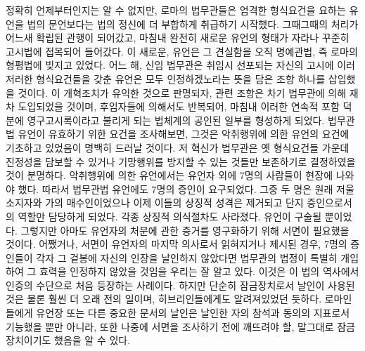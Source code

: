정확히 언제부터인지는 알 수 없지만,
로마의 법무관들은
엄격한 형식요건을 요하는 유언을
법의 문언보다는 법의 정신에 더 부합하게
취급하기 시작했다.
그때그때의 처리가 어느새 확립된 관행이 되어갔고,
마침내 완전히 새로운 유언의 형태가 자라나
꾸준히 고시법에 접목되어 들어갔다.
이 새로운,  유언은 그 견실함을
오직 명예관법, 즉 로마의 형평법에
빚지고 있었다.
어느 해, 신임 법무관은 취임시 선포되는 자신의 고시에
이러저러한 형식요건들을 갖춘 유언은 모두 인정하겠노라는 뜻을 담은
조항 하나를 삽입했을 것이다.
이 개혁조치가 유익한 것으로 판명되자, 관련 조항은
차기 법무관에 의해 재차 도입되었을 것이며,
후임자들에 의해서도 반복되어, 마침내
이러한 연속적 포함 덕분에 영구고시록이라고 불리게 되는
법체계의 공인된 일부를 형성하게 되었다.
법무관법 유언이 유효하기 위한 요건을 조사해보면,
그것은 악취행위에 의한 유언의 요건에 기초하고 있었음이 명백히 드러날 것이다.
저 혁신가 법무관은 옛 형식요건들 가운데 진정성을 담보할 수 있거나
기망행위를 방지할 수 있는 것들만 보존하기로 결정하였을 것이 분명하다.
악취행위에 의한 유언에서는 유언자 외에 7명의 사람들이 현장에 나와야 했다.
따라서 법무관법 유언에도 7명의 증인이 요구되었다.
그중 두 명은 원래 저울소지자와
가의 매수인이었으나 이제 이들의 상징적 성격은
제거되고 단지 증인으로서의 역할만 담당하게 되었다.
각종 상징적 의식절차도 사라졌다.
유언이 구술될 뿐이었다. 그렇지만 아마도
유언자의 처분에 관한 증거를 영구화하기 위해 서면이 필요했을 것이다.
어쨌거나, 서면이 유언자의 마지막 의사로서 읽혀지거나 제시된 경우,
7명의 증인들이 각자 그 겉봉에 자신의 인장을 날인하지 않았다면
법무관의 법정이
특별히 개입하여
그 효력을 인정하지 않았을 것임을 우리는 잘 알고 있다.
이것은
이
법의 역사에서
인증의 수단으로
처음 등장하는 사례이다.
하지만
단순히 잠금장치로서 날인이 사용된 것은 물론 훨씬 더 오래 전의 일이며,
히브리인들에게도 알려져있었던 듯하다.
로마인들에게 유언장 또는 다른 중요한 문서의 날인은
날인한 자의 참석과 동의의 지표로서 기능했을 뿐만 아니라,
또한
나중에 서면을 조사하기 전에 깨뜨려야 할, 말그대로 잠금장치이기도 했음을
알 수 있다.

